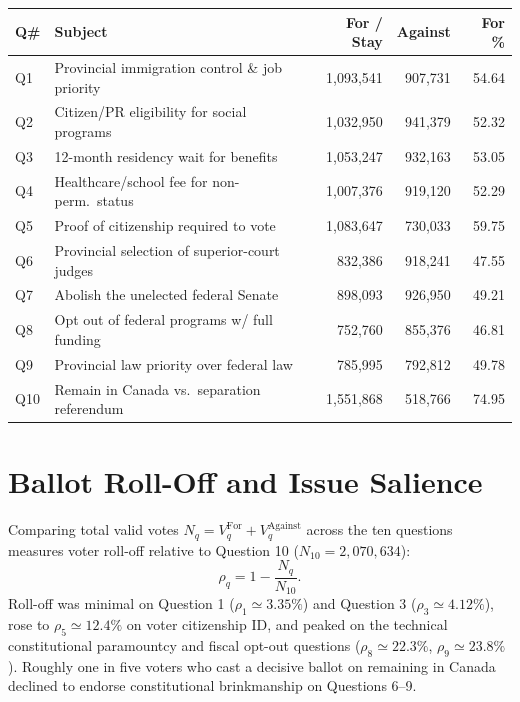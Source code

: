 \documentclass[11pt]{article}
\begin{document}
\begin{center}
\begin{tabular}{lp{6.4cm}rrr}
\hline
\textbf{Q\#} & \textbf{Subject} & \textbf{For / Stay} & \textbf{Against} & \textbf{For \%} \\
\hline
Q1 & Provincial immigration control \& job priority & 1,093,541 & 907,731 & 54.64 \\
Q2 & Citizen/PR eligibility for social programs & 1,032,950 & 941,379 & 52.32 \\
Q3 & 12-month residency wait for benefits & 1,053,247 & 932,163 & 53.05 \\
Q4 & Healthcare/school fee for non-perm.\ status & 1,007,376 & 919,120 & 52.29 \\
Q5 & Proof of citizenship required to vote & 1,083,647 & 730,033 & 59.75 \\
\hline
Q6 & Provincial selection of superior-court judges & 832,386 & 918,241 & 47.55 \\
Q7 & Abolish the unelected federal Senate & 898,093 & 926,950 & 49.21 \\
Q8 & Opt out of federal programs w/ full funding & 752,760 & 855,376 & 46.81 \\
Q9 & Provincial law priority over federal law & 785,995 & 792,812 & 49.78 \\
\hline
Q10 & Remain in Canada vs.\ separation referendum & 1,551,868 & 518,766 & 74.95 \\
\hline
\end{tabular}
\end{center}

\section{Ballot Roll-Off and Issue Salience}
\label{sec:roll-off}
Comparing total valid votes $N_q = V_q^{\text{For}} + V_q^{\text{Against}}$ across the ten questions measures voter roll-off relative to Question 10 ($N_{10} = 2{,}070{,}634$):
\begin{equation}
\rho_q = 1 - \frac{N_q}{N_{10}}.
\label{eq:rolloff}
\end{equation}
Roll-off was minimal on Question 1 ($\rho_1 \simeq 3.35\%$) and Question 3 ($\rho_3 \simeq 4.12\%$), rose to $\rho_5 \simeq 12.4\%$ on voter citizenship ID, and peaked on the technical constitutional paramountcy and fiscal opt-out questions ($\rho_8 \simeq 22.3\%$, $\rho_9 \simeq 23.8\%$). Roughly one in five voters who cast a decisive ballot on remaining in Canada declined to endorse constitutional brinkmanship on Questions 6--9.
\end{document}
